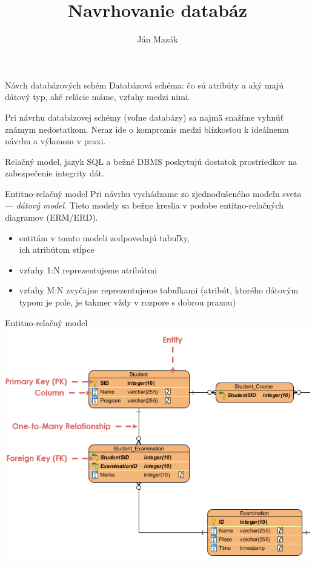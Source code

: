 \documentclass[12pt]{beamer}
\title{Navrhovanie databáz}
\author{Ján Mazák}
\institute{FMFI UK Bratislava}
\date{}
\begin{document}
\frame{\titlepage}

\begin{frame}[fragile]{Návrh databázových schém}
\alert{Databázová schéma}: čo sú atribúty a aký majú dátový typ, aké relácie máme, vzťahy medzi nimi.
\bigskip

Pri návrhu databázovej schémy (voľne databázy) sa najmä snažíme vyhnúť známym nedostatkom.
Neraz ide o kompromis medzi blízkosťou k ideálnemu návrhu a výkonom v praxi.
\bigskip

Relačný model, jazyk SQL a bežné DBMS poskytujú dostatok prostriedkov na zabezpečenie integrity dát.
\end{frame}

\begin{frame}[fragile]{Entitno-relačný model}
Pri návrhu vychádzame zo zjednodušeného modelu sveta --- \emph{dátový model}.
Tieto modely sa bežne kreslia v podobe \alert{entitno-relačných diagramov} (ERM/ERD).
\begin{itemize}
\item entitám v tomto modeli zodpovedajú tabuľky,\\ ich atribútom stĺpce
\item vzťahy 1:N reprezentujeme atribútmi
\item vzťahy M:N zvyčajne reprezentujeme tabuľkami
(atribút, ktorého dátovým typom je pole, je takmer vždy v rozpore s dobrou praxou)
\end{itemize}
\end{frame}

\begin{frame}[fragile]{Entitno-relačný model}
\includegraphics[scale=.5]{erd.png}
\end{frame}
\end{document}
